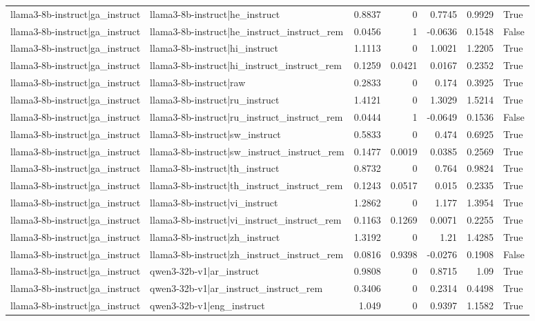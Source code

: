 \begin{table}
\begin{tabular}{l l r r r r l}
llama3-8b-instruct|ga_instruct & llama3-8b-instruct|he_instruct & 0.8837 & 0 & 0.7745 & 0.9929 & True \\
llama3-8b-instruct|ga_instruct & llama3-8b-instruct|he_instruct_instruct_rem & 0.0456 & 1 & -0.0636 & 0.1548 & False \\
llama3-8b-instruct|ga_instruct & llama3-8b-instruct|hi_instruct & 1.1113 & 0 & 1.0021 & 1.2205 & True \\
llama3-8b-instruct|ga_instruct & llama3-8b-instruct|hi_instruct_instruct_rem & 0.1259 & 0.0421 & 0.0167 & 0.2352 & True \\
llama3-8b-instruct|ga_instruct & llama3-8b-instruct|raw & 0.2833 & 0 & 0.174 & 0.3925 & True \\
llama3-8b-instruct|ga_instruct & llama3-8b-instruct|ru_instruct & 1.4121 & 0 & 1.3029 & 1.5214 & True \\
llama3-8b-instruct|ga_instruct & llama3-8b-instruct|ru_instruct_instruct_rem & 0.0444 & 1 & -0.0649 & 0.1536 & False \\
llama3-8b-instruct|ga_instruct & llama3-8b-instruct|sw_instruct & 0.5833 & 0 & 0.474 & 0.6925 & True \\
llama3-8b-instruct|ga_instruct & llama3-8b-instruct|sw_instruct_instruct_rem & 0.1477 & 0.0019 & 0.0385 & 0.2569 & True \\
llama3-8b-instruct|ga_instruct & llama3-8b-instruct|th_instruct & 0.8732 & 0 & 0.764 & 0.9824 & True \\
llama3-8b-instruct|ga_instruct & llama3-8b-instruct|th_instruct_instruct_rem & 0.1243 & 0.0517 & 0.015 & 0.2335 & True \\
llama3-8b-instruct|ga_instruct & llama3-8b-instruct|vi_instruct & 1.2862 & 0 & 1.177 & 1.3954 & True \\
llama3-8b-instruct|ga_instruct & llama3-8b-instruct|vi_instruct_instruct_rem & 0.1163 & 0.1269 & 0.0071 & 0.2255 & True \\
llama3-8b-instruct|ga_instruct & llama3-8b-instruct|zh_instruct & 1.3192 & 0 & 1.21 & 1.4285 & True \\
llama3-8b-instruct|ga_instruct & llama3-8b-instruct|zh_instruct_instruct_rem & 0.0816 & 0.9398 & -0.0276 & 0.1908 & False \\
llama3-8b-instruct|ga_instruct & qwen3-32b-v1|ar_instruct & 0.9808 & 0 & 0.8715 & 1.09 & True \\
llama3-8b-instruct|ga_instruct & qwen3-32b-v1|ar_instruct_instruct_rem & 0.3406 & 0 & 0.2314 & 0.4498 & True \\
llama3-8b-instruct|ga_instruct & qwen3-32b-v1|eng_instruct & 1.049 & 0 & 0.9397 & 1.1582 & True \\

\end{tabular}
\end{table}
